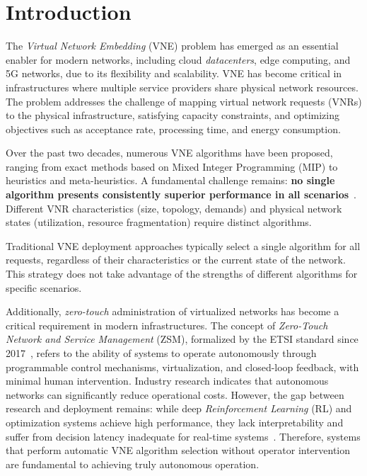 \documentclass[runningheads]{llncs}
\begin{document}

\section{Introduction}
\label{sec:Intro}

The \textit{Virtual Network Embedding} (VNE) problem has emerged as an essential enabler for modern networks, including cloud \textit{datacenters}, edge computing, and 5G networks, due to its flexibility and scalability. VNE has become critical in infrastructures where multiple service providers share physical network resources. The problem addresses the challenge of mapping virtual network requests (VNRs) to the physical infrastructure, satisfying capacity constraints, and optimizing objectives such as acceptance rate, processing time, and energy consumption.

Over the past two decades, numerous VNE algorithms have been proposed, ranging from exact methods based on Mixed Integer Programming (MIP) to heuristics and meta-heuristics.
A fundamental challenge remains: \textbf{no single algorithm presents consistently superior performance in all scenarios}~\cite{fischer2013vne-survey}.
Different VNR characteristics (size, topology, demands) and physical network states (utilization, resource fragmentation) require distinct algorithms.

Traditional VNE deployment approaches typically select a single algorithm for all requests, regardless of their characteristics or the current state of the network. This strategy does not take advantage of the strengths of different algorithms for specific scenarios.

Additionally, \textit{zero-touch} administration of virtualized networks has become a critical requirement in modern infrastructures.
The concept of \textit{Zero-Touch Network and Service Management} (ZSM), formalized by the ETSI standard since 2017~\cite{etsi-zsm}, refers to the ability of systems to operate autonomously through programmable control mechanisms, virtualization, and closed-loop feedback, with minimal human intervention.
Industry research indicates that autonomous networks can significantly reduce operational costs.
However, the gap between research and deployment remains: while deep \textit{Reinforcement Learning} (RL) and optimization systems achieve high performance, they lack interpretability and suffer from decision latency inadequate for real-time systems~\cite{white2024zerotough}.
Therefore, systems that perform automatic VNE algorithm selection without operator intervention are fundamental to achieving truly autonomous operation.
\end{document}
